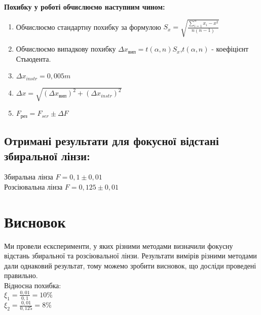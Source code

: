 
\begin{center}
  \textbf{Похибку у роботі обчислюємо наступним чином:}
\end{center}
\begin{enumerate}
  \item Обчислюємо стандартну похибку за формулою $S_x = \sqrt{\frac{\sum\limits_{i=1}^n{x_i - x}^2}{n(n-1)}}$
  \item Обчислюємо випадкову похибку $\Delta x_{вип} = t(\alpha , n) S_x$,$t(\alpha, n )$ - коефіцієнт Стьюдента.
  \item $\Delta x_{instr} = 0,005m$
  \item {$\Delta x = \sqrt{(\Delta x_{вип})^2 + (\Delta x_{instr})^2}$}
  \item $F_{рез} = F_{ser} \pm \Delta F$
\end{enumerate}
\subsection{Отримані результати для фокусної відстані збиральної лінзи:}
Збиральна лінза $F = 0,1 \pm 0,01$ \\
Розсіювальна лінза $F = 0,125 \pm 0,01$\\
\section{Висновок}
\setlength{\parindent}{4em}
\qquad Ми провели есксперименти, у яких різними методами визначили фокусну відстань збиральної та розсіювальної лінзи. Результати вимірів різними методами дали однаковий результат, тому можемо зробити висновок, що досліди проведені правильно.\\
Відносна похибка:\\ $\xi_1 =\frac{0,01}{0,1} = 10\%$ \\
$\xi_2 =\frac{0,01}{0,125} = 8\%$
